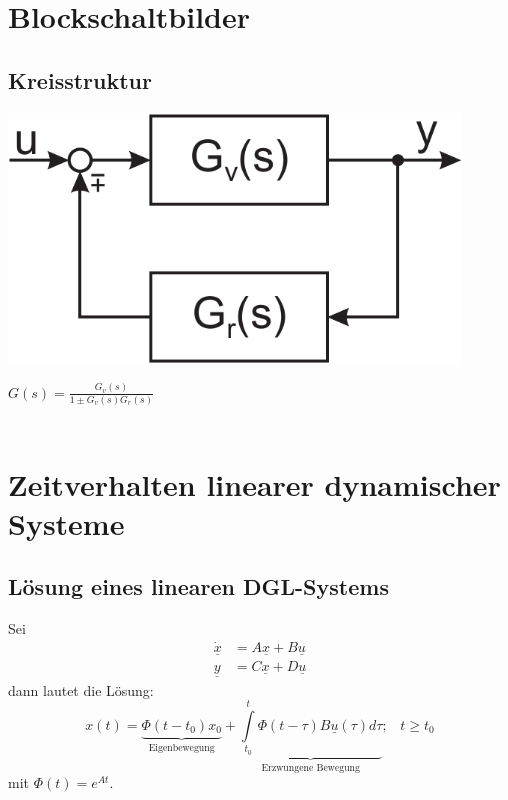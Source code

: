 \documentclass[a4paper,twocolumn,10pt]{article}
\begin{document}
\section{Blockschaltbilder}

\subsection{Kreisstruktur}
\begin{minipage}[b]{0.45\columnwidth}
\includegraphics[width=0.9\textwidth]{Grafiken/Kreisstruktur}
\end{minipage}
\hfill
\begin{minipage}[b]{0.55\columnwidth}
$G(s)=\frac{G_v(s)}{1\pm G_v(s)G_r(s)}$\\\\
\end{minipage}

\section{Zeitverhalten linearer dynamischer Systeme}

\subsection{Lösung eines linearen DGL-Systems}
Sei
\begin{equation*}
\begin{split}
\underline{\dot{x}}&=A\underline{x}+B\underline{u}\\
\underline{y}&=C\underline{x}+D\underline{u}
\end{split}
\end{equation*}
dann lautet die Lösung:
\begin{equation*}
x(t)=\underbrace{\Phi(t-t_0)x_0}_{\text{Eigenbewegung}}+\underbrace{\int\limits_{t_0}^{t}\Phi(t-\tau)B\underline{u}(\tau)d\tau}_{\text{Erzwungene Bewegung}};\;\;\;t\geq t_0
\end{equation*}
mit $\Phi(t)=e^{At}$.
\end{document}
